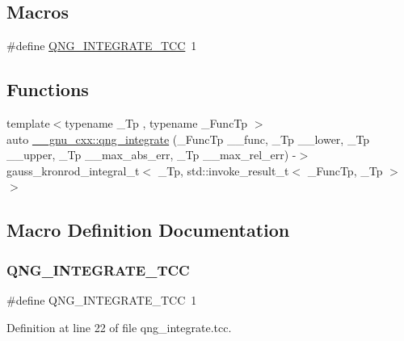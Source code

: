 \subsection*{Macros}
\begin{DoxyCompactItemize}
\item 
\#define \hyperlink{qng__integrate_8tcc_a13280020863bb3afdcc3ea0d0b00783c}{Q\+N\+G\+\_\+\+I\+N\+T\+E\+G\+R\+A\+T\+E\+\_\+\+T\+CC}~1
\end{DoxyCompactItemize}
\subsection*{Functions}
\begin{DoxyCompactItemize}
\item 
{\footnotesize template$<$typename \+\_\+\+Tp , typename \+\_\+\+Func\+Tp $>$ }\\auto \hyperlink{namespace____gnu__cxx_aeb2e96052964961b91888d93c4433cbe}{\+\_\+\+\_\+gnu\+\_\+cxx\+::qng\+\_\+integrate} (\+\_\+\+Func\+Tp \+\_\+\+\_\+func, \+\_\+\+Tp \+\_\+\+\_\+lower, \+\_\+\+Tp \+\_\+\+\_\+upper, \+\_\+\+Tp \+\_\+\+\_\+max\+\_\+abs\+\_\+err, \+\_\+\+Tp \+\_\+\+\_\+max\+\_\+rel\+\_\+err) -\/$>$ gauss\+\_\+kronrod\+\_\+integral\+\_\+t$<$ \+\_\+\+Tp, std\+::invoke\+\_\+result\+\_\+t$<$ \+\_\+\+Func\+Tp, \+\_\+\+Tp $>$$>$
\end{DoxyCompactItemize}


\subsection{Macro Definition Documentation}
\mbox{\label{qng__integrate_8tcc_a13280020863bb3afdcc3ea0d0b00783c}} 
\subsubsection{\texorpdfstring{Q\+N\+G\+\_\+\+I\+N\+T\+E\+G\+R\+A\+T\+E\+\_\+\+T\+CC}{QNG\_INTEGRATE\_TCC}}
{\footnotesize\ttfamily \#define Q\+N\+G\+\_\+\+I\+N\+T\+E\+G\+R\+A\+T\+E\+\_\+\+T\+CC~1}



Definition at line 22 of file qng\+\_\+integrate.\+tcc.

